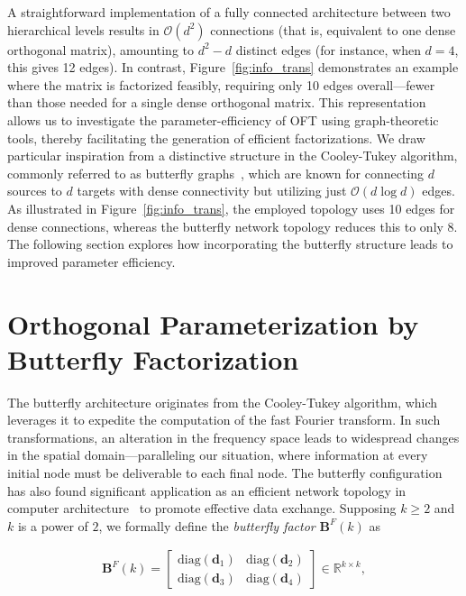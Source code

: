 A straightforward implementation of a fully connected architecture between two hierarchical levels results in $\mathcal{O}(d^2)$ connections (that is, equivalent to one dense orthogonal matrix), amounting to $d^2-d$ distinct edges (for instance, when $d=4$, this gives 12 edges). In contrast, Figure~\ref{fig:info_trans} demonstrates an example where the matrix is factorized feasibly, requiring only 10 edges overall—fewer than those needed for a single dense orthogonal matrix. This representation allows us to investigate the parameter-efficiency of OFT using graph-theoretic tools, thereby facilitating the generation of efficient factorizations. We draw particular inspiration from a distinctive structure in the Cooley-Tukey algorithm, commonly referred to as butterfly graphs~\cite{cooley1965algorithm}, which are known for connecting $d$ sources to $d$ targets with dense connectivity but utilizing just $\mathcal{O}(d\log d)$ edges. As illustrated in Figure~\ref{fig:info_trans}, the employed topology uses 10 edges for dense connections, whereas the butterfly network topology reduces this to only 8. The following section explores how incorporating the butterfly structure leads to improved parameter efficiency.

\section{Orthogonal Parameterization by Butterfly Factorization}

The butterfly architecture originates from the Cooley-Tukey algorithm, which leverages it to expedite the computation of the fast Fourier transform. In such transformations, an alteration in the frequency space leads to widespread changes in the spatial domain—paralleling our situation, where information at every initial node must be deliverable to each final node. The butterfly configuration has also found significant application as an efficient network topology in computer architecture~\cite{solihin2015fundamentals,li2011linear} to promote effective data exchange. Supposing $k\geq 2$ and $k$ is a power of $2$, we formally define the \emph{butterfly factor} $\bm{B}^F(k)$ as

\begin{equation}\label{eq:but_factor}
\begin{aligned}
    \bm{B}^F(k)=\begin{bmatrix}
    \text{diag}(\bm{d}_1) & \text{diag}(\bm{d}_2) \\
    \text{diag}(\bm{d}_3) & \text{diag}(\bm{d}_4)
    \end{bmatrix}\in\mathbb{R}^{k\times k},
\end{aligned}
\end{equation}


